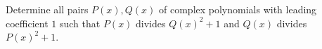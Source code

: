 Determine all pairs $P(x),Q(x)$ of complex polynomials with leading coefficient $1$ such that $P(x)$ divides $Q(x)^2+1$ and $Q(x)$ divides $P(x)^2+1$.

